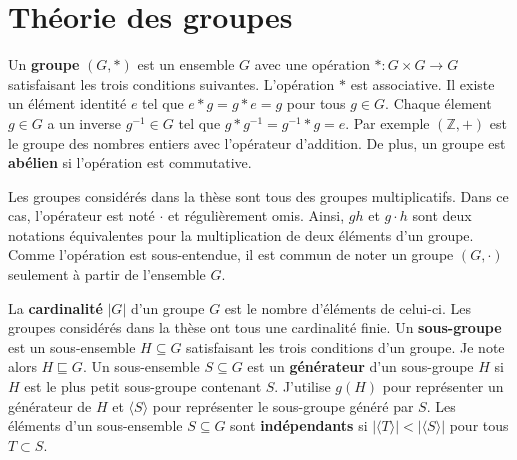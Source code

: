 \chapter{Théorie des groupes}
\label{chap:theo_groupes}

Un \textbf{groupe} $(G, *)$ est un ensemble $G$ avec une opération $* : G \times G \to G$
satisfaisant les trois conditions suivantes.
L'opération $*$ est associative.
Il existe un élément identité $e$ tel que $e * g = g * e = g$ pour tous $g \in G$.
Chaque élement $g \in G$ a un inverse $g^{-1} \in G$ tel que $g * g^{-1} = g^{-1} * g = e$.
Par exemple $(\mathbb Z, +)$ est le groupe des nombres entiers avec l'opérateur d'addition.
De plus, un groupe est \textbf{abélien} si l'opération est commutative.

Les groupes considérés dans la thèse sont tous des groupes multiplicatifs.
Dans ce cas, l'opérateur est noté $\cdot$ et régulièrement omis.
Ainsi, $gh$ et $g \cdot h$ sont deux notations équivalentes pour la multiplication 
de deux éléments d'un groupe.
Comme l'opération est sous-entendue,
il est commun de noter un groupe $(G, \cdot)$ seulement à partir de l'ensemble $G$.

La \textbf{cardinalité} $|G|$ d'un groupe $G$ est le nombre d'éléments de celui-ci.
Les groupes considérés dans la thèse ont tous une cardinalité finie.
Un \textbf{sous-groupe} est un sous-ensemble $H \subseteq G$ satisfaisant les trois conditions
d'un groupe.
Je note alors $H \sqsubseteq G$.
Un sous-ensemble $S \subseteq G$ est un \textbf{générateur} d'un sous-groupe $H$ si $H$ est le plus petit
sous-groupe contenant $S$.
J'utilise $g(H)$ pour représenter un générateur de $H$ 
et $\langle S \rangle$ pour représenter le sous-groupe généré par $S$.
Les éléments d'un sous-ensemble $S \subseteq G$ sont \textbf{indépendants} si 
$|\langle T \rangle| < |\langle S \rangle|$ pour tous $T \subset S$.

